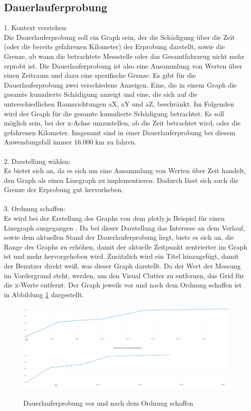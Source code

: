 \subsection{Dauerlauferprobung}
\label{section:dauerlauferprobung}
1. Kontext verstehen:\\
Die Dauerlauferprobung soll ein Graph sein, der die Schädigung über die Zeit (oder die bereits gefahrenen Kilometer) der Erprobung darstellt, sowie die Grenze, ab wann die betrachtete Messstelle oder das Gesamtfahrzeug nicht mehr erprobt ist. Die Dauerlauferprobung ist also eine Ansammlung von Werten über einen Zeitraum und dazu eine spezifische Grenze. Es gibt für die Dauerlauferprobung zwei verschiedene Anzeigen. Eine, die in einem Graph die gesamte kumulierte Schädigung anzeigt und eine, die sich auf die unterschiedlichen Raumrichtungen aX, aY und aZ, beschränkt. Im Folgenden wird der Graph für die gesamte kumulierte Schädigung betrachtet. Es soll möglich sein, bei der x-Achse umzustellen, ob die Zeit betrachtet wird, oder die gefahrenen Kilometer. Insgesamt sind in einer Dauerlauferprobung bei diesem Anwendungsfall immer 16.000 km zu fahren.\\\\
2. Darstellung wählen:\\
Es bietet sich an, da es sich um eine Ansammlung von Werten über Zeit handelt, den Graph als einen Linegraph zu implementieren. Dadurch lässt sich auch die Grenze der Erprobung gut hervorheben.\\\\
 3. Ordnung schaffen:\\
Es wird bei der Erstellung des Graphs von dem plotly.js Beispiel für einen Linegraph ausgegangen \cite{Plotly.2024}. Da bei dieser Darstellung das Interesse an dem Verlauf, sowie dem aktuellen Stand der Dauerlauferprobung liegt, biete es sich an, die Range des Graphs zu erhöhen, damit der aktuelle Zeitpunkt zentrierter im Graph ist und mehr hervorgehoben wird. Zusätzlich wird ein Titel hinzugefügt, damit der Benutzer direkt weiß, was dieser Graph darstellt. Da der Wert der Messung im Vordergrund steht, werden, um den Visual Clutter zu entfernen, das Grid für die x-Werte entfernt. Der Graph jeweils vor und nach dem Ordnung schaffen ist in Abbildung \ref{fig:dauerlauferprobung_before} dargestellt.
\begin{figure}[!h]
    \centering
    \includegraphics[width=\linewidth]{gfx/dauerlauferprobung_before.png}
        \includegraphics[width=1\linewidth]{gfx/dauerlauferprobung-after.png}
    \caption{Dauerlauferprobung vor und nach dem Ordnung schaffen}
    \label{fig:dauerlauferprobung_before}
\end{figure}
